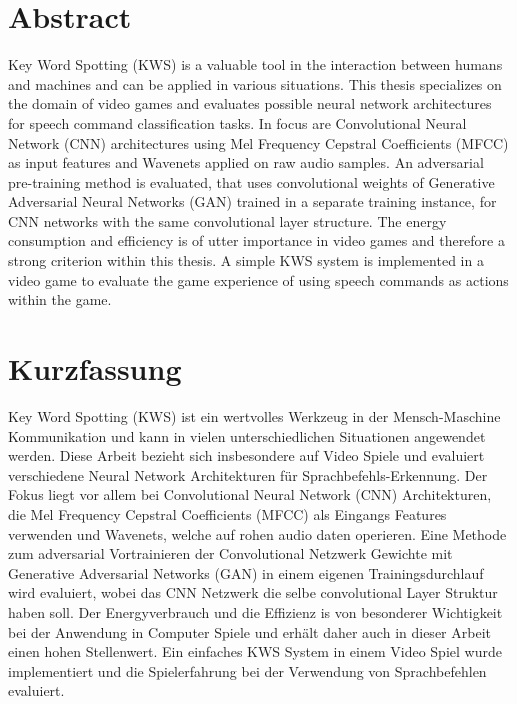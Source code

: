 
\chapter*{Abstract}\label{sec:shards_abstract}
\thesisStateReady
Key Word Spotting (KWS) is a valuable tool in the interaction between humans and machines and can be applied in various situations.
This thesis specializes on the domain of video games and evaluates possible neural network architectures for speech command classification tasks.
In focus are Convolutional Neural Network (CNN) architectures using Mel Frequency Cepstral Coefficients (MFCC) as input features and Wavenets applied on raw audio samples.
An adversarial pre-training method is evaluated, that uses convolutional weights of Generative Adversarial Neural Networks (GAN) trained in a separate training instance, for CNN networks with the same convolutional layer structure.
The energy consumption and efficiency is of utter importance in video games and therefore a strong criterion within this thesis.
A simple KWS system is implemented in a video game to evaluate the game experience of using speech commands as actions within the game.




\chapter*{Kurzfassung}
\thesisStateReady
Key Word Spotting (KWS) ist ein wertvolles Werkzeug in der Mensch-Maschine Kommunikation und kann in vielen unterschiedlichen Situationen angewendet werden.
Diese Arbeit bezieht sich insbesondere auf Video Spiele und evaluiert verschiedene Neural Network Architekturen für Sprachbefehls-Erkennung.
Der Fokus liegt vor allem bei Convolutional Neural Network (CNN) Architekturen, die Mel Frequency Cepstral Coefficients (MFCC) als Eingangs Features verwenden und Wavenets, welche auf rohen audio daten operieren.
Eine Methode zum adversarial Vortrainieren der Convolutional Netzwerk Gewichte mit Generative Adversarial Networks (GAN) in einem eigenen Trainingsdurchlauf wird evaluiert, wobei das CNN Netzwerk die selbe convolutional Layer Struktur haben soll.
Der Energyverbrauch und die Effizienz is von besonderer Wichtigkeit bei der Anwendung in Computer Spiele und erhält daher auch in dieser Arbeit einen hohen Stellenwert.
Ein einfaches KWS System in einem Video Spiel wurde implementiert und die Spielerfahrung bei der Verwendung von Sprachbefehlen evaluiert.
